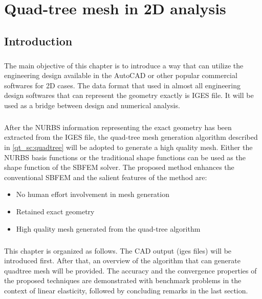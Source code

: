 \chapter{Quad-tree mesh in 2D analysis}
\label{qdt_sec:main}
\section{Introduction}
\paragraph{}
The main objective of this chapter is to introduce a way that can utilize the engineering design available in the AutoCAD or other popular commercial softwares for 2D cases.
The data format that used in almost all engineering design softwares that can represent the geometry exactly is IGES file.
It will be used as a bridge between design and numerical analysis.
%
\paragraph{}
After the NURBS information representing the exact geometry has been extracted from the IGES file, the quad-tree mesh generation algorithm described in \ref{qt_sc:quadtree} will be adopted to generate a high quality mesh.
Either the NURBS basis functions or the traditional shape functions can be used as the shape function of the SBFEM solver.
The proposed method enhances the conventional SBFEM and the salient features of the method are:
    \begin{itemize}
        \item No human effort involvement in mesh generation
        \item Retained exact geometry
        \item High quality mesh generated from the quad-tree algorithm
    \end{itemize}
\paragraph{}
This chapter is organized as follows.
The CAD output (iges files) will be introduced first.
After that, an overview of the algorithm that can generate quadtree mesh will be provided.
The accuracy and the convergence properties of the proposed techniques are demonstrated with benchmark problems in the context of linear elasticity, followed by concluding remarks in the last section.
\pagebreak

